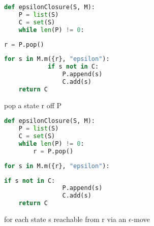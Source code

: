 \documentclass[8pt,a4paper,compress]{beamer}
\begin{document}
\begin{frame}[fragile]
\begin{overprint}
\begin{tcolorbox}[enhanced,drop shadow southwest,sharp corners,size=fbox,colback=white,fontlower=\small\ttfamily,collower=silver900]

\begin{lstlisting}[language=Python,style=focusout]
def epsilonClosure(S, M):
    P = list(S)
    C = set(S)
    while len(P) != 0:
\end{lstlisting}
\begin{lstlisting}[language=Python,style=focusin,backgroundcolor=\color{lime100}]
        r = P.pop()
\end{lstlisting}
\begin{lstlisting}[language=Python,style=focusout]
        for s in M.m({r}, "epsilon"):
            if s not in C:
                P.append(s)
                C.add(s)
    return C
\end{lstlisting}

\tcblower
\begin{minipage}[t][.25cm][t]{\textwidth}
pop a state r off P
\end{minipage}
\end{tcolorbox}

\begin{tcolorbox}[enhanced,drop shadow southwest,sharp corners,size=fbox,colback=white,fontlower=\small\ttfamily,collower=silver900]

\begin{lstlisting}[language=Python,style=focusout]
def epsilonClosure(S, M):
    P = list(S)
    C = set(S)
    while len(P) != 0:
        r = P.pop()
\end{lstlisting}
\begin{lstlisting}[language=Python,style=focusin,backgroundcolor=\color{lime100}]
        for s in M.m({r}, "epsilon"):
\end{lstlisting}
\begin{lstlisting}[language=Python,style=focusout]
            if s not in C:
                P.append(s)
                C.add(s)
    return C
\end{lstlisting}

\tcblower
\begin{minipage}[t][.25cm][t]{\textwidth}
for each state s reachable from r via an $\epsilon$-move
\end{minipage}
\end{tcolorbox}

\begin{tcolorbox}[enhanced,drop shadow southwest,sharp corners,size=fbox,colback=white,fontlower=\small\ttfamily,collower=silver900]


\end{tcolorbox}
\end{overprint}
\end{frame}
\end{document}
